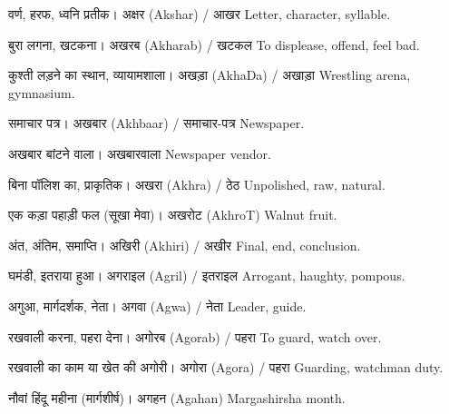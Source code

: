 %
{वर्ण, हरफ, ध्वनि प्रतीक।}%
{अक्षर (Akshar) / आखर}%
{Letter, character, syllable.}

%
{बुरा लगना, खटकना।}%
{अखरब (Akharab) / खटकल}%
{To displease, offend, feel bad.}

%
{कुश्ती लड़ने का स्थान, व्यायामशाला।}%
{अखड़ा (AkhaDa) / अखाड़ा}%
{Wrestling arena, gymnasium.}

%
{समाचार पत्र।}%
{अखबार (Akhbaar) / समाचार-पत्र}%
{Newspaper.}

%
{अखबार बांटने वाला।}%
{अखबारवाला}%
{Newspaper vendor.}

%
{बिना पॉलिश का, प्राकृतिक।}%
{अखरा (Akhra) / ठेठ}%
{Unpolished, raw, natural.}

%
{एक कड़ा पहाड़ी फल (सूखा मेवा)।}%
{अखरोट (AkhroT)}%
{Walnut fruit.}

%
{अंत, अंतिम, समाप्ति।}%
{अखिरी (Akhiri) / अखीर}%
{Final, end, conclusion.}

%
{घमंडी, इतराया हुआ।}%
{अगराइल (Agril) / इतराइल}%
{Arrogant, haughty, pompous.}

%
{अगुआ, मार्गदर्शक, नेता।}%
{अगवा (Agwa) / नेता}%
{Leader, guide.}

%
{रखवाली करना, पहरा देना।}%
{अगोरब (Agorab) / पहरा}%
{To guard, watch over.}

%
{रखवाली का काम या खेत की अगोरी।}%
{अगोरा (Agora) / पहरा}%
{Guarding, watchman duty.}

%
{नौवां हिंदू महीना (मार्गशीर्ष)।}%
{अगहन (Agahan)}%
{Margashirsha month.}

